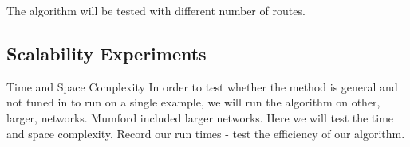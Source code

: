 



The algorithm will be tested with different number of routes.



\subsection{Scalability Experiments}
Time and Space Complexity
In order to test whether the method is general and not tuned in to run on a single example, we will run the algorithm on other, larger, networks. Mumford included larger networks. Here we will test the time and space complexity.
Record our run times - test the efficiency of our algorithm.




